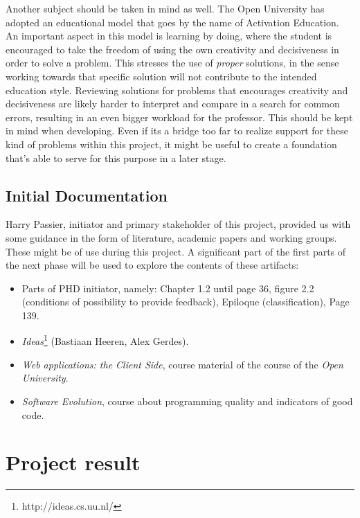 \documentclass{article}
\begin{document}
Another subject should be taken in mind as well. The Open University has
adopted an educational model that goes by the name of Activation Education. An
important aspect in this model is learning by doing, where the student is
encouraged to take the freedom of using the own creativity and decisiveness in
order to solve a problem. This stresses the use of {\em proper} solutions, in
the sense working towards that specific solution will not contribute to the
intended education style. Reviewing solutions for problems that encourages
creativity and decisiveness are likely harder to interpret and compare in a
search for common errors, resulting in an even bigger workload for the
professor. This should be kept in mind when developing. Even if its a bridge
too far to realize support for these kind of problems within this project, it
might be useful to create a foundation that's able to serve for this purpose in
a later stage.

\subsection{Initial Documentation}

Harry Passier, initiator and primary stakeholder of this project, provided us 
with some guidance in the form of literature, academic papers and working 
groups. These might be of use during this project. A significant part of the 
first parts of the next phase will be used to explore the contents of these 
artifacts:
\begin{itemize}
  \item Parts of PHD initiator, namely: Chapter 1.2 until page 36, figure 2.2
    (conditions of possibility to provide feedback), Epiloque (classification),
    Page 139.
  \item {\em Ideas}\footnote{http://ideas.cs.uu.nl/} (Bastiaan Heeren, Alex
    Gerdes).
  \item {\em Web applications: the Client Side}, course material of the course
    of the {\em Open University}.
  \item {\em Software Evolution}, course about programming quality and
    indicators of good code.
\end{itemize}

\section{Project result}
\end{document}
